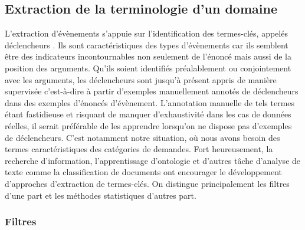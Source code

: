 \subsection{Extraction de la terminologie d'un domaine}
L'extraction d'évènements s'appuie sur l'identification des termes-clés, appelés \og déclencheurs \fg{}. Ils sont caractéristiques des types d'évènements car ils semblent être des indicateurs incontournables non seulement de l'énoncé mais aussi de la position des arguments. Qu'ils soient identifiés préalablement ou conjointement avec les arguments, les déclencheurs sont jusqu'à présent appris de manière supervisée c'est-à-dire à partir d'exemples manuellement annotés de déclencheurs dans des exemples d'énoncés d'évènement. L'annotation manuelle de tels termes étant fastidieuse et risquant de manquer d'exhaustivité dans les cas de données réelles, il serait préférable de les apprendre lorsqu'on ne dispose pas d'exemples de déclencheurs. C'est notamment notre situation, où nous avons besoin des termes caractéristiques des catégories de demandes. Fort heureusement, la recherche d'information, l'apprentissage d'ontologie et d'autres tâche d'analyse de texte comme la classification de documents ont encourager le développement d'approches d'extraction de termes-clés. On distingue principalement les filtres d'une part et les méthodes statistiques d'autres part.


\subsubsection{Filtres}
